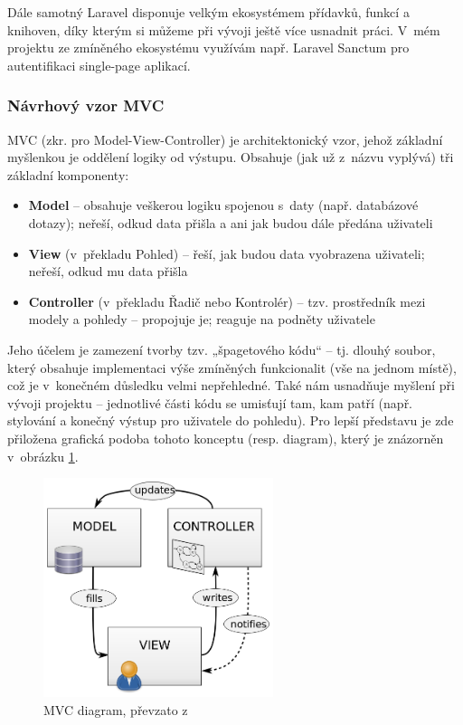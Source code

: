 	Dále samotný Laravel disponuje velkým ekosystémem přídavků, funkcí a knihoven, díky kterým si můžeme při vývoji ještě více usnadnit práci. \cite{LaravelEco} V~mém projektu ze zmíněného ekosystému využívám např. Laravel Sanctum pro autentifikaci single-page aplikací.
	
		\subsubsection{Návrhový vzor MVC}
		MVC (zkr. pro Model-View-Controller) je architektonický vzor, jehož základní myšlenkou je oddělení logiky od výstupu. Obsahuje (jak už z~názvu vyplývá) tři základní komponenty:
		
		\begin{itemize}
			\item \textbf{Model} – obsahuje veškerou logiku spojenou s~daty (např. databázové dotazy); neřeší, odkud data přišla a ani jak budou dále předána uživateli
			\item \textbf{View} (v~překladu Pohled) – řeší, jak budou data vyobrazena uživateli; neřeší, odkud mu data přišla
			\item \textbf{Controller} (v~překladu Řadič nebo Kontrolér) – tzv. prostředník mezi modely a pohledy – propojuje je; reaguje na podněty uživatele
		\end{itemize}
	
		Jeho účelem je zamezení tvorby tzv. „špagetového kódu“ – tj. dlouhý soubor, který obsahuje implementaci výše zmíněných funkcionalit (vše na jednom místě), což je v~konečném důsledku velmi nepřehledné. Také nám usnadňuje myšlení při vývoji projektu – jednotlivé části kódu se umisťují tam, kam patří (např. stylování a konečný výstup pro uživatele do pohledu). \cite{MVC} Pro lepší představu je zde přiložena grafická podoba tohoto konceptu (resp. diagram), který je znázorněn v~obrázku \ref{fig:mvc_diagram}.
		
		\begin{figure}[h]
			\centering
			\includegraphics[width=0.6\textwidth]{img/mvc_diagram.png}
			\caption{MVC diagram, převzato z \cite{MVCDiagram}}
			\label{fig:mvc_diagram}
		\end{figure}
		
